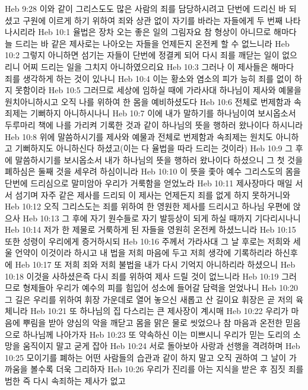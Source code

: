 Heb 9:28  이와 같이 그리스도도 많은 사람의 죄를 담당하시려고 단번에 드리신 바 되셨고 구원에 이르게 하기 위하여 죄와 상관 없이 자기를 바라는 자들에게 두 번째 나타나시리라
Heb 10:1  율법은 장차 오는 좋은 일의 그림자요 참 형상이 아니므로 해마다 늘 드리는 바 같은 제사로는 나아오는 자들을 언제든지 온전케 할 수 없느니라
Heb 10:2  그렇지 아니하면 섬기는 자들이 단번에 정결케 되어 다시 죄를 깨닫는 일이 없으리니 어찌 드리는 일을 그치지 아니하였으리요
Heb 10:3  그러나 이 제사들은 해마다 죄를 생각하게 하는 것이 있나니
Heb 10:4  이는 황소와 염소의 피가 능히 죄를 없이 하지 못함이라
Heb 10:5  그러므로 세상에 임하실 때에 가라사대 하나님이 제사와 예물을 원치아니하시고 오직 나를 위하여 한 몸을 예비하셨도다
Heb 10:6  전체로 번제함과 속죄제는 기뻐하지 아니하시나니
Heb 10:7  이에 내가 말하기를 하나님이여 보시옵소서 두루마리 책에 나를 가리켜 기록한 것과 같이 하나님의 뜻을 행하러 왔나이다 하시니라
Heb 10:8  위에 말씀하시기를 제사와 예물과 전체로 번제함과 속죄제는 원치도 아니하고 기뻐하지도 아니하신다 하셨고(이는 다 율법을 따라 드리는 것이라)
Heb 10:9  그 후에 말씀하시기를 보시옵소서 내가 하나님의 뜻을 행하러 왔나이다 하셨으니 그 첫 것을 폐하심은 둘째 것을 세우려 하심이니라
Heb 10:10  이 뜻을 좇아 예수 그리스도의 몸을 단번에 드리심으로 말미암아 우리가 거룩함을 얻었노라
Heb 10:11  제사장마다 매일 서서 섬기며 자주 같은 제사를 드리되 이 제사는 언제든지 죄를 없게 하지 못하거니와
Heb 10:12  오직 그리스도는 죄를 위하여 한 영원한 제사를 드리시고 하나님 우편에 앉으사
Heb 10:13  그 후에 자기 원수들로 자기 발등상이 되게 하실 때까지 기다리시나니
Heb 10:14  저가 한 제물로 거룩하게 된 자들을 영원히 온전케 하셨느니라
Heb 10:15  또한 성령이 우리에게 증거하시되
Heb 10:16  주께서 가라사대 그 날 후로는 저희와 세울 언약이 이것이라 하시고 내 법을 저희 마음에 두고 저희 생각에 기록하리라 하신후에
Heb 10:17  또 저희 죄와 저희 불법을 내가 다시 기억지 아니하리라 하셨으니
Heb 10:18  이것을 사하셨은즉 다시 죄를 위하여 제사 드릴 것이 없느니라
Heb 10:19  그러므로 형제들아 우리가 예수의 피를 힘입어 성소에 들어갈 담력을 얻었나니
Heb 10:20  그 길은 우리를 위하여 휘장 가운데로 열어 놓으신 새롭고 산 길이요 휘장은 곧 저의 육체니라
Heb 10:21  또 하나님의 집 다스리는 큰 제사장이 계시매
Heb 10:22  우리가 마음에 뿌림을 받아 양심의 악을 깨닫고 몸을 맑은 물로 씻었으나 참 마음과 온전한 믿음으로 하나님께 나아가자
Heb 10:23  또 약속하신 이는 미쁘시니 우리가 믿는 도리의 소망을 움직이지 말고 굳게 잡아
Heb 10:24  서로 돌아보아 사랑과 선행을 격려하며
Heb 10:25  모이기를 폐하는 어떤 사람들의 습관과 같이 하지 말고 오직 권하여 그 날이 가까움을 볼수록 더욱 그리하자
Heb 10:26  우리가 진리를 아는 지식을 받은 후 짐짓 죄를 범한 즉 다시 속죄하는 제사가 없고
